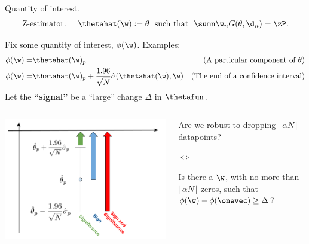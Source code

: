 \begin{frame}{Quantity of interest.}
%
\vspace{-2em}
\begin{align*}
%
\textrm{Z-estimator: }\quad
\thetahat(\w) :=
\theta \,\, \textrm{ such that } \,\,
\sumn \w_{n} G(\theta, \d_{n}) =  \zP .
%
\end{align*}
%
\pause

Fix some quantity of interest, $\phi(\w)$.  Examples:
%
\begin{align*}
    \phi(\w) =&{} \thetahat(\w)_p & \textrm{(A particular component of }\theta\textrm{)}\\
    \phi(\w) =&{} \thetahat(\w)_p + \frac{1.96}{\sqrt{N}} \hat\sigma(\thetahat(\w), \w)
        & \textrm{(The end of a confidence interval)}
\end{align*}
%
\pause
Let the \textbf{``signal''} be a ``large'' change $\Delta$ in $\thetafun$.
%
%
\begin{columns}
%
\begin{column}{0.55\linewidth}
\includegraphics[width=0.95\linewidth]{static_figures/adversarial_robustness_example_phi_flipped.png}
\end{column}
%
\begin{column}{0.44\linewidth}
    \pause

    \begin{center}
        Are we robust to dropping $\lfloor \alpha N \rfloor$ datapoints?

        \textbf{$\Leftrightarrow$}

        Is there a $\w$, with no more than
        $\lfloor \alpha N \rfloor$ zeros, such that
        $\phi(\w) - \phi(\onevec) \ge \Delta$?
    \end{center}


\end{column}
\end{columns}

\end{frame}



